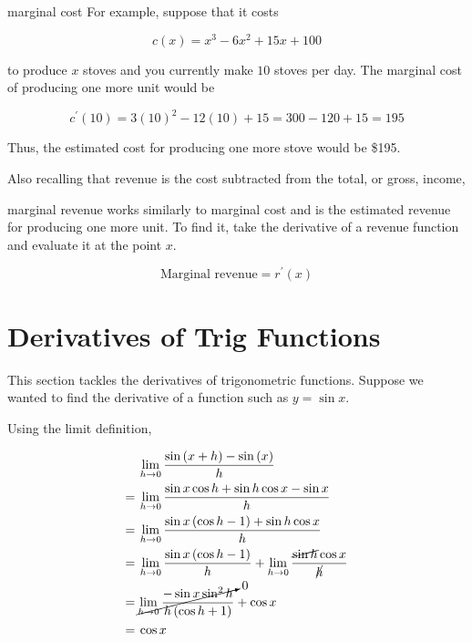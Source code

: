 \begin{example}{marginal cost}
    For example, suppose that it costs
    
    \[ c \left( x \right) = x^3 - 6x^2 + 15x + 100 \]
    
    to produce \( x \) stoves and you currently make \( 10 \) stoves per day. The marginal cost of producing one more unit would be
    
    \[ c^\prime \left( 10 \right) = 3 \left( 10 \right)^2  - 12 \left( 10 \right) + 15 = 300 - 120 + 15 = 195 \]
    
    Thus, the estimated cost for producing one more stove would be \$195.
\end{example}

Also recalling that revenue is the cost subtracted from the total, or gross, income,

\begin{definition}{marginal revenue}
     works similarly to marginal cost and is the estimated revenue for producing one more unit. To find it, take the derivative of a revenue function and evaluate it at the point \( x \).

    \[ \text{Marginal revenue} = r^\prime \left( x \right) \]
\end{definition}

\section{Derivatives of Trig Functions}

This section tackles the derivatives of trigonometric functions. Suppose we wanted to find the derivative of a function such as \( y = \sin{x} \).

Using the limit definition,

\begin{align}
    &\lim_{h \to 0} \dfrac{\sin{\left( x + h \right)} - \sin{\left( x \right)}}{h} \\
    = \> &\lim_{h \to 0} \dfrac{\sin{x}\cos{h} + \sin{h}\cos{x} - \sin{x}}{h} \\
    = \> &\lim_{h \to 0} \dfrac{\sin{x} \left( \cos{h} - 1 \right) + \sin{h}\cos{x}}{h} \\
    = \> &\lim_{h \to 0} \dfrac{\sin{x} \left( \cos{h} - 1 \right)}{h} + \lim_{h \to 0} \dfrac{\cancel{\sin{h}} \cos{x}}{\cancel{h}} \\
    = \> &\cancelto{0}{\lim_{h \to 0} \dfrac{-\sin{x}\sin^2{h}}{h \left( \cos{h} + 1 \right)}} + \cos{x} \\
    = \> &\cos{x}
\end{align}

